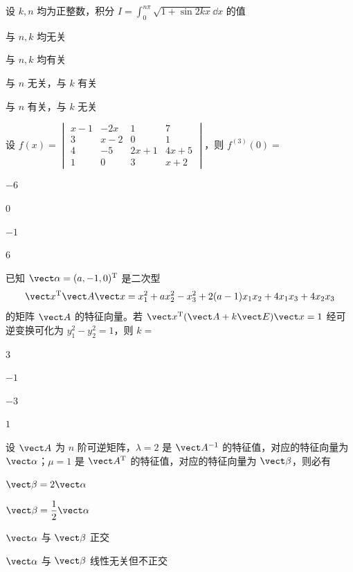 \begin{question}[index=4]
设 $k,n$ 均为正整数，积分 $\displaystyle I=\int_0^{n\pi}\sqrt{1+\sin 2kx}\dd x$ 的值
\begin{choices}[columns=2]
\item 与 $n,k$ 均无关
\item 与 $n,k$ 均有关
\item 与 $n$ 无关，与 $k$ 有关
\item 与 $n$ 有关，与 $k$ 无关
\end{choices}
\end{question}
\QuestionBreak

\begin{question}[index=5]
设 $\displaystyle f(x)=\begin{vmatrix}
x-1&-2x&1&7\\
3&x-2&0&1\\
4&-5&2x+1&4x+5\\
1&0&3&x+2
\end{vmatrix}$，则 $f^{(3)}(0)=$
\begin{choices}[columns=4]
\item $-6$
\item $0$
\item $-1$
\item $6$
\end{choices}
\end{question}
\QuestionBreak

\begin{question}[index=6]
已知 $\vect\alpha=(a,-1,0)^{\mathrm T}$ 是二次型
\[
 \vect x^{\mathrm T}\vect A\vect x=x_1^2+ax_2^2-x_3^2+2(a-1)x_1x_2+4x_1x_3+4x_2x_3
\]
的矩阵 $\vect A$ 的特征向量。若 $\vect x^{\mathrm T}(\vect A+k\vect E)\vect x=1$ 经可逆变换可化为 $y_1^2-y_2^2=1$，则 $k=$
\begin{choices}[columns=4]
\item $3$
\item $-1$
\item $-3$
\item $1$
\end{choices}
\end{question}
\QuestionBreak

\begin{question}[index=7]
设 $\vect A$ 为 $n$ 阶可逆矩阵，$\lambda=2$ 是 $\vect A^{-1}$ 的特征值，对应的特征向量为 $\vect\alpha$；$\mu=1$ 是 $\vect A^{\mathrm T}$ \allowbreak\mbox{的特征值}，对应的特征向量为 $\vect\beta$，则必有
\begin{choices}[columns=2]
\item $\vect\beta=2\vect\alpha$
\item $\vect\beta=\dfrac12\vect\alpha$
\item $\vect\alpha$ 与 $\vect\beta$ 正交
\item $\vect\alpha$ 与 $\vect\beta$ 线性无关但不正交
\end{choices}
\end{question}
\QuestionBreak

